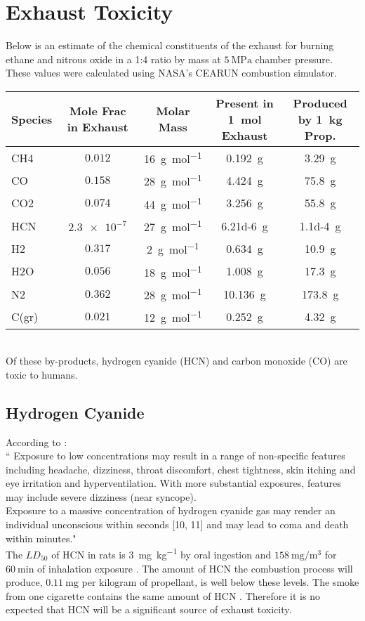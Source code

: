 \documentclass{article}
\begin{document}
\section{Exhaust Toxicity}
Below is an estimate of the chemical constituents of the exhaust for burning ethane and nitrous oxide in a 1:4 ratio by mass at $\SI{5}{\mega\pascal}$ chamber pressure.
These values were calculated using NASA's CEARUN combustion simulator.\\
\begin{tabular}{ l | c | c | c | c }
Species & Mole Frac in Exhaust & Molar Mass & Present in \SI{1}{\mole} Exhaust & Produced by \SI{1}{\kg} Prop.\\
\hline
CH4 & $0.012$ & \SI{16}{\gram\per\mole} & \SI{0.192}{\gram} & \SI{3.29}{\gram} \\
CO  & $0.158$ & \SI{28}{\gram\per\mole} & \SI{4.424}{\gram} & \SI{75.8}{\gram} \\
CO2 & $0.074$ & \SI{44}{\gram\per\mole} & \SI{3.256}{\gram} & \SI{55.8}{\gram} \\
HCN & $\num{2.3e-7}$& \SI{27}{\gram\per\mole} & \SI{6.21d-6}{\gram} & \SI{1.1d-4}{\gram} \\
H2  & $0.317$ & \SI{2}{\gram\per\mole}  & \SI{0.634}{\gram} & \SI{10.9}{\gram} \\
H2O & $0.056$ & \SI{18}{\gram\per\mole} & \SI{1.008}{\gram} & \SI{17.3}{\gram} \\
N2  & $0.362$ & \SI{28}{\gram\per\mole} & \SI{10.136}{\gram} & \SI{173.8}{\gram} \\
C(gr)&$0.021$ & \SI{12}{\gram\per\mole} & \SI{0.252}{\gram} & \SI{4.32}{\gram} \\
\end{tabular}
\\
Of these by-products, hydrogen cyanide (HCN) and carbon monoxide (CO) are toxic to humans.\\
\subsection{Hydrogen Cyanide}
According to \cite{HCNtox}:\\
`` Exposure to low concentrations may result in a range of non-specific features including
headache, dizziness, throat discomfort, chest tightness, skin itching and eye irritation and 
hyperventilation. With more substantial exposures, features may include severe 
dizziness (near syncope).\\
Exposure to a massive concentration of hydrogen cyanide gas may render an individual 
unconscious within seconds [10, 11] and may lead to coma and death within minutes."\\
The $LD_{50}$  of HCN in rats is \SI{3}{\milli\gram\per\kg} by oral ingestion and 
$\SI{158}{\milli\gram\per\cubic\metre}$ for $\SI{60}{\minute}$ of inhalation exposure \cite{HCNtox}.
The amount of HCN the combustion process will produce, $\SI{0.11}{\milli\gram}$ per kilogram of propellant,
is well below these levels. The smoke from one cigarette contains the same amount of HCN \cite{HCNtox}.
Therefore it is no expected that HCN will be a significant source of exhaust toxicity.\\
\end{document}
